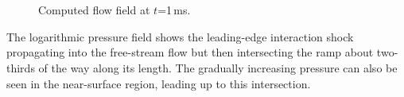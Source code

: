 \begin{figure}[htbp]
 \centering
 \\
 \\
 \caption{Computed flow field at $t$=1\,ms.}
 \label{fig:cubic-ramp-field-data}
\end{figure}

\medskip
The logarithmic pressure field shows the leading-edge interaction shock propagating into the free-stream
flow but then intersecting the ramp about two-thirds of the way along its length.
The gradually increasing pressure can also be seen in the near-surface region, leading up to this intersection.

